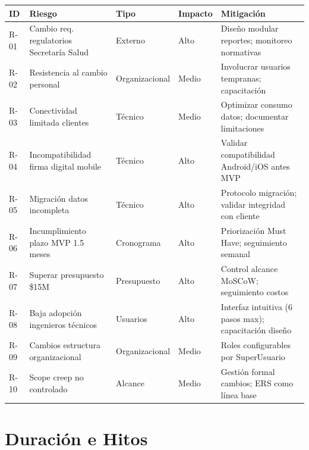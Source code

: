 \documentclass[12pt,a4paper]{article}
\begin{document}
\vspace{0.3cm}
\begin{longtable}{|L{0.6cm}|L{3.2cm}|L{2.5cm}|L{1.8cm}|L{4.0cm}|}
\hline
\textbf{ID} & \textbf{Riesgo} & \textbf{Tipo} & \textbf{Impacto} & \textbf{Mitigación} \\
\hline
\endhead

R-01 & Cambio req. regulatorios Secretaría Salud & Externo & Alto & Diseño modular reportes; monitoreo normativas \\
\hline

R-02 & Resistencia al cambio personal & Organizacional & Medio & Involucrar usuarios tempranas; capacitación \\
\hline

R-03 & Conectividad limitada clientes & Técnico & Medio & Optimizar consumo datos; documentar limitaciones \\
\hline

R-04 & Incompatibilidad firma digital mobile & Técnico & Alto & Validar compatibilidad Android/iOS antes MVP \\
\hline

R-05 & Migración datos incompleta & Técnico & Alto & Protocolo migración; validar integridad con cliente \\
\hline

R-06 & Incumplimiento plazo MVP 1.5 meses & Cronograma & Alto & Priorización Must Have; seguimiento semanal \\
\hline

R-07 & Superar presupuesto \$15M & Presupuesto & Alto & Control alcance MoSCoW; seguimiento costos \\
\hline

R-08 & Baja adopción ingenieros técnicos & Usuarios & Alto & Interfaz intuitiva (6 pasos max); capacitación diseño \\
\hline

R-09 & Cambios estructura organizacional & Organizacional & Medio & Roles configurables por SuperUsuario \\
\hline

R-10 & Scope creep no controlado & Alcance & Medio & Gestión formal cambios; ERS como línea base \\
\hline

\end{longtable}

\section{Duración e Hitos}
\end{document}

